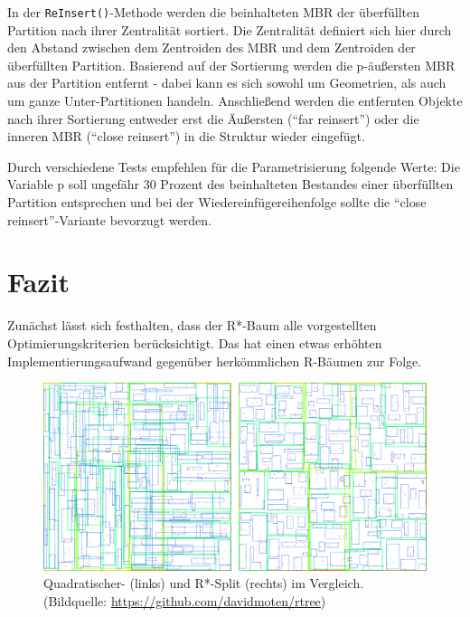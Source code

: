 \documentclass[runningheads,a4paper]{llncs}
\begin{document}
	In der \texttt{ReInsert()}-Methode werden die beinhalteten \acs{MBR} der überfüllten Partition nach ihrer Zentralität sortiert. Die Zentralität definiert sich hier durch den Abstand zwischen dem Zentroiden des \acs{MBR} und dem Zentroiden der überfüllten Partition. Basierend auf der Sortierung werden die \acs{p}-äußersten \acs{MBR} aus der Partition entfernt - dabei kann es sich sowohl um Geometrien, als auch um ganze Unter-Partitionen handeln. Anschließend werden die entfernten Objekte nach ihrer Sortierung entweder erst die Äußersten (\enquote{far reinsert}) oder die inneren \acs{MBR} (\enquote{close reinsert}) in die Struktur wieder eingefügt.

	Durch verschiedene Tests empfehlen \Textcite{Beckmann:1990} für die Parametrisierung folgende Werte: Die Variable \acs{p} soll ungefähr 30 Prozent des beinhalteten Bestandes einer überfüllten Partition entsprechen und bei der Wiedereinfügereihenfolge sollte die \enquote{close reinsert}-Variante bevorzugt werden.


\section{Fazit} %
\label{sec:fazit}

	Zunächst lässt sich festhalten, dass der R*-Baum alle vorgestellten Optimierungskriterien berücksichtigt. Das hat einen etwas erhöhten Implementierungsaufwand gegenüber herkömmlichen R-Bäumen zur Folge.

	\begin{figure}[H]
		\centering
		\includegraphics[width=1\textwidth]{vergleich-quad-star.png}
		\caption{Quadratischer- (links) und R*-Split (rechts) im Vergleich. (Bildquelle: \url{https://github.com/davidmoten/rtree})}
		\label{fig:vergleich-quad-star}
	\end{figure}
\end{document}
